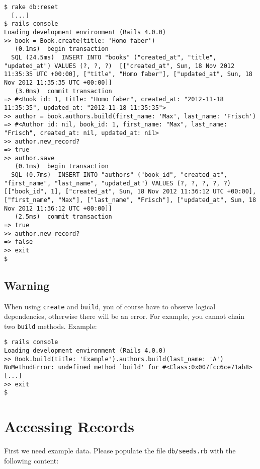 \documentclass[a4paper]{book}
\newcommand{\chap}[1]{\newpage\thispagestyle{empty}\chapter{#1}\label{chap:\thechapter}}
\begin{document}
\begin{shaded}\begin{verbatim}
$ rake db:reset
  [...]
$ rails console
Loading development environment (Rails 4.0.0)
>> book = Book.create(title: 'Homo faber')
   (0.1ms)  begin transaction
  SQL (24.5ms)  INSERT INTO "books" ("created_at", "title", "updated_at") VALUES (?, ?, ?)  [["created_at", Sun, 18 Nov 2012 11:35:35 UTC +00:00], ["title", "Homo faber"], ["updated_at", Sun, 18 Nov 2012 11:35:35 UTC +00:00]]
   (3.0ms)  commit transaction
=> #<Book id: 1, title: "Homo faber", created_at: "2012-11-18 11:35:35", updated_at: "2012-11-18 11:35:35">
>> author = book.authors.build(first_name: 'Max', last_name: 'Frisch')
=> #<Author id: nil, book_id: 1, first_name: "Max", last_name: "Frisch", created_at: nil, updated_at: nil>
>> author.new_record?
=> true
>> author.save
   (0.1ms)  begin transaction
  SQL (0.7ms)  INSERT INTO "authors" ("book_id", "created_at", "first_name", "last_name", "updated_at") VALUES (?, ?, ?, ?, ?)  [["book_id", 1], ["created_at", Sun, 18 Nov 2012 11:36:12 UTC +00:00], ["first_name", "Max"], ["last_name", "Frisch"], ["updated_at", Sun, 18 Nov 2012 11:36:12 UTC +00:00]]
   (2.5ms)  commit transaction
=> true
>> author.new_record?
=> false
>> exit
$
\end{verbatim}\end{shaded}

\section{Warning}\label{warning-2}

When using \texttt{create} and \texttt{build}, you of course have to observe logical dependencies, otherwise there will be an error. For example, you cannot chain two \texttt{build} methods. Example:

\begin{shaded}\begin{verbatim}
$ rails console
Loading development environment (Rails 4.0.0)
>> Book.build(title: 'Example').authors.build(last_name: 'A')
NoMethodError: undefined method `build' for #<Class:0x007fcc6ce71ab8>
[...]
>> exit
$
\end{verbatim}\end{shaded}

\chap{Accessing Records}\label{accessing-records}

First we need example data. Please populate the file \texttt{db/seeds.rb} with the following content:
\end{document}

